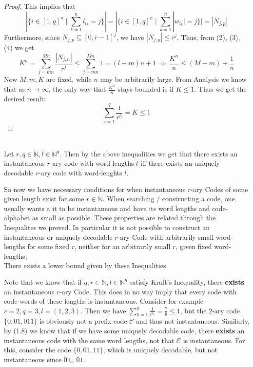 \documentclass[12pt]{article}
\newenvironment{statement2}[2]{\begin{trivlist}
\item[\hskip \labelsep {\bfseries #1}\hskip \labelsep {\bfseries #2}]}{\end{trivlist}}
\newenvironment{statement3}[3]{\begin{trivlist}
\item[\hskip \labelsep {\bfseries #1}\hskip \labelsep {\bfseries #2} {#3}\textbf{.}]}{\end{trivlist}}
\begin{document}
\begin{statement3}{(1.7)}{Theorem}{(McMillan's Inequality)}
\begin{proof}
        This implies that
        \begin{equation}
            |\{i \in [1,q]^n \mid \sum_{k=1}^{n} l_{i_k} = j\}|
            = |\{i \in [1,q]^n \mid \sum_{k=1}^{n} |w_{i_k}| = j\}| \tag{4}
            = |N_{j,p}|
        \end{equation}
        Furthermore, since $N_{j,p} \subseteq [0,r-1]^j$, we have $|N_{j,p}| \leq r^j$. Thus, from (2), (3), (4) we get
        $$
            K^n = \sum_{j = mn}^{Mn} \frac{|N_{j,n}|}{r^j} \leq \sum_{j = mn}^{Mn} 1 = (l-m)n + 1
            \,\Longrightarrow\, \frac{K^n}{n} \leq (M-m) + \frac{1}{n}
        $$
        Now $M,m,K$ are fixed, while $n$ may be arbitrarily large. From Analysis we know
        that as $n \to \infty$, the only way that $\frac{K^n}{n}$ stays bounded is if $K \leq 1$.
        Thus we get the desired result:
        $$
            \sum_{i=1}^{q} \frac{1}{r^{l_i}} = K \leq 1
        $$
    \end{proof}
\end{statement3}

\begin{statement2}{(1.8)}{Corollary.}\strut\\[2pt]
    Let $r,q \in \mathbb{N}, l \in \mathbb{N}^q$. Then by the above inequalities we get
    that there exists an instantaneous $r$-ary code with word-lengths $l$ iff
    there exists an uniquely decodable $r$-ary code with word-lenghts $l$.
\end{statement2}

So now we have necessary conditions for when instantaneous $r$-ary Codes of some
given length exist for some $r \in \mathbb{N}$.
When searching / constructing a code, one usually wants a it to be instantaneous and have
its word lengths and code-alphabet as small as possible.
These properties are related through the Inequalites we proved.
In particular it is not possible to construct an instantaneous or uniquely decodable $r$-ary Code
with arbitrarily small word-lengths for some fixed $r$, neither for an arbitrarily small
$r$, given fixed word-lengths;\\
There exists a lower bound given by these Inequalities.

\begin{statement2}{(1.9)}{Remark.}
    Note that we know that if $q,r \in \mathbb{N}, l \in \mathbb{N}^q$
    satisfy Kraft's Inequality, there \textbf{exists} an instantaneous $r$-ary Code. This does in no way imply
    that every code with code-words of these lengths is instantaneous. Consider for example
    $r = 2, q = 3, l = (1,2,3)$. Then we have $\sum_{k=1}^{q} \frac{1}{r^{l_k}} = \frac{7}{8} \leq 1$,
    but the $2$-ary code $\{0, 01, 011\}$ is obviously not a prefix-code $\mathcal{C}$ and thus not instantaneous.
    Similarly, by (1.8) we know that if we have some uniquely decodable code, there \textbf{exists} an
    instantaneous code with the same word lengths, not that $\mathcal{C}$ is instantaneous. For this,
    consider the code $\{0,01,11\}$, which is uniquely decodable, but not instantaneous since $0 \sqsubseteq 01$.
\end{statement2}
\end{document}

